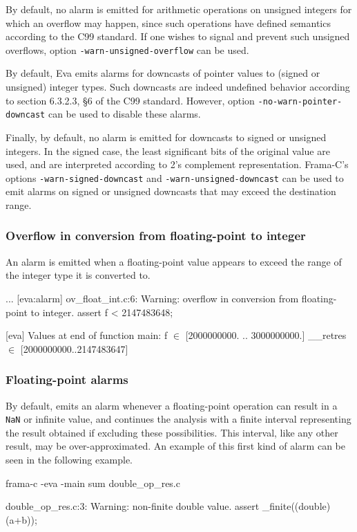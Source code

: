 \documentclass{frama-c-book}
\newcommand{\isoc}{\textsf{C99}}
\begin{document}
By default, no alarm is emitted for arithmetic operations on unsigned integers
for which an overflow may happen, since such operations have
defined semantics according to the \isoc{} standard.
If one wishes to signal and prevent such unsigned overflows,
option \verb+-warn-unsigned-overflow+ can be used.

By default, Eva emits alarms for downcasts of pointer values to (signed
or unsigned) integer types. Such downcasts are indeed  undefined behavior
according to section 6.3.2.3, §6 of the \isoc{} standard.
However, option \lstinline|-no-warn-pointer-downcast| can be used to disable
these alarms.

Finally, by default, no alarm is emitted for downcasts to signed or unsigned
integers. In the signed case, the least significant bits
of the original value are used, and are interpreted according
to 2's complement representation.
Frama-C's options \lstinline|-warn-signed-downcast| and
\lstinline|-warn-unsigned-downcast| can be used to emit alarms on signed
or unsigned downcasts that may exceed the destination range.


\subsubsection{Overflow in conversion from floating-point to integer}
An alarm is emitted when a floating-point value appears to exceed the
range of the integer type it is converted to.

\begin{logsmath}
...
[eva:alarm] ov_float_int.c:6: Warning: overflow in conversion from floating-point
 to integer. assert f < 2147483648;

[eva] Values at end of function main:
f $\in$ [2000000000. .. 3000000000.]
__retres $\in$ [2000000000..2147483647]
\end{logsmath}

\subsubsection{Floating-point alarms}

By default, \Eva{} emits an alarm whenever a floating-point operation can result
in a \lstinline|NaN| or infinite value, and continues the analysis
with a finite interval representing the result obtained
if excluding these possibilities. This interval, like
any other result, may be over-approximated. An example of this
first kind of alarm can be seen in the following example.
\begin{frama-c-commands}
frama-c -eva -main sum double_op_res.c
\end{frama-c-commands}
\begin{logsmath}
 double_op_res.c:3: Warning: non-finite double value.
    assert \is_finite((double)(a+b));
\end{logsmath}
\end{document}
